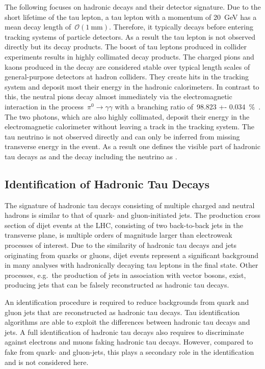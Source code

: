 The following focuses on hadronic decays and their detector signature. Due to
the short lifetime of the tau lepton, a tau lepton with a momentum of
\SI{20}{\GeV} has a mean decay length of~$\mathcal{O}(\SI{1}{\milli\metre})$.
Therefore, it typically decays before entering tracking systems of particle
detectors. As a result the tau lepton is not observed directly but its decay
products. The boost of tau leptons produced in collider experiments results in
highly collimated decay products. The charged pions and kaons produced in the
decay are considered stable over typical length scales of general-purpose
detectors at hadron colliders. They create hits in the tracking system and
deposit most their energy in the hadronic calorimeters. In contrast to this, the
neutral pions decay almost immediately via the electromagnetic interaction in
the process~\mbox{$\pi^0 \to \gamma\gamma$} with a branching ratio of~\SI{98.823
  +- 0.034}{\percent}~\cite{pdg}. The two photons, which are also highly
collimated, deposit their energy in the electromagnetic calorimeter without
leaving a track in the tracking system. The tau neutrino is not observed
directly and can only be inferred from missing transverse energy in the event.
As a result one defines the visible part of hadronic tau decays as \tauhadvis
and the decay including the neutrino as \tauhad.

\subsection{Identification of Hadronic Tau Decays}
\label{sec:features_tau_decay}

The signature of hadronic tau decays consisting of multiple charged and neutral
hadrons is similar to that of quark- and gluon-initiated jets. The production
cross section of dijet events at the LHC, consisting of two back-to-back jets in
the transverse plane, is multiple orders of magnitude larger than electroweak
processes of interest. Due to the similarity of hadronic tau decays and jets
originating from quarks or gluons, dijet events represent a significant
background in many analyses with hadronically decaying tau leptons in the final
state. Other processes, e.g.\ the production of jets in association with vector
bosons, exist, producing jets that can be falsely reconstructed as hadronic tau
decays.

An identification procedure is required to reduce backgrounds from quark and
gluon jets that are reconstructed as hadronic tau decays. Tau identification
algorithms are able to exploit the differences between hadronic tau decays and
jets. A full identification of hadronic tau decays also requires to discriminate
against electrons and muons faking hadronic tau decays. However, compared to
fake \tauhad from quark- and gluon-jets, this plays a secondary role in the
identification and is not considered here.

